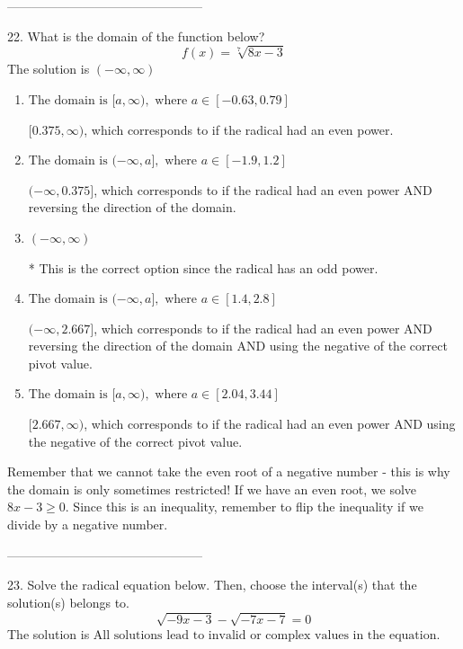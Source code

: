 \documentclass{article}[14pt]
\begin{document}
-----------------------------------------------

22. What is the domain of the function below?
$$ f(x) = \sqrt[7]{8 x - 3} $$ 
The solution is $ (-\infty, \infty) $ 

\begin{enumerate}[label=\Alph*.] 
\item $ \text{The domain is } [a, \infty), \text{   where } a \in [-0.63, 0.79] $ 

 $[0.375, \infty)$, which corresponds to if the radical had an even power. 
\item $ \text{The domain is } (-\infty, a], \text{   where } a \in [-1.9, 1.2] $ 

 $(-\infty, 0.375]$, which corresponds to if the radical had an even power AND reversing the direction of the domain. 
\item $ (-\infty, \infty) $ 

 * This is the correct option since the radical has an odd power. 
\item $ \text{The domain is } (-\infty, a], \text{   where } a \in [1.4, 2.8] $ 

 $(-\infty, 2.667]$, which corresponds to if the radical had an even power AND reversing the direction of the domain AND using the negative of the correct pivot value. 
\item $ \text{The domain is } [a, \infty), \text{   where } a \in [2.04, 3.44] $ 

 $[2.667, \infty)$, which corresponds to if the radical had an even power AND using the negative of the correct pivot value. 
\end{enumerate} 
 
Remember that we cannot take the even root of a negative number - this is why the domain is only sometimes restricted! If we have an even root, we solve $8 x - 3 \geq 0$. Since this is an inequality, remember to flip the inequality if we divide by a negative number.

-----------------------------------------------

23. Solve the radical equation below. Then, choose the interval(s) that the solution(s) belongs to.
$$ \sqrt{-9 x - 3} - \sqrt{-7 x - 7} = 0 $$ 
The solution is $ \text{All solutions lead to invalid or complex values in the equation.} $ 
\end{document}
